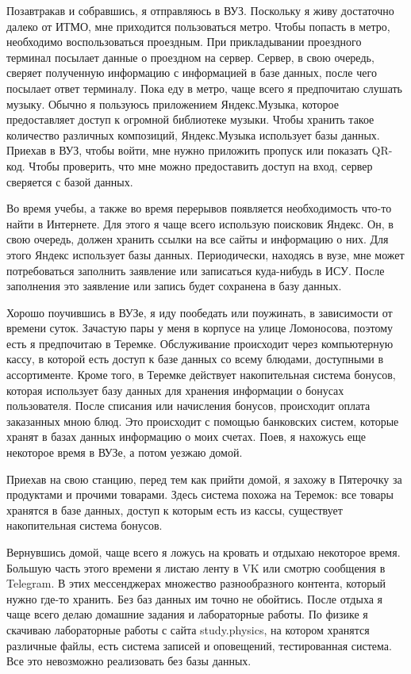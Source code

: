 \documentclass[a4paper,14pt]{extarticle}
\begin{document}
Позавтракав и собравшись, я отправляюсь в ВУЗ. Поскольку я живу достаточно далеко от ИТМО, мне приходится пользоваться метро. Чтобы попасть в метро, необходимо воспользоваться проездным. При прикладывании проездного терминал посылает данные о проездном на сервер. Сервер, в свою очередь, сверяет полученную информацию с информацией в базе данных, после чего посылает ответ терминалу. Пока еду в метро, чаще всего я предпочитаю слушать музыку. Обычно я пользуюсь приложением Яндекс.Музыка, которое предоставляет доступ к огромной библиотеке музыки. Чтобы хранить такое количество различных композиций, Яндекс.Музыка использует базы данных. Приехав в ВУЗ, чтобы войти, мне нужно приложить пропуск или показать QR-код. Чтобы проверить, что мне можно предоставить доступ на вход, сервер сверяется с базой данных.

Во время учебы, а также во время перерывов появляется необходимость что-то найти в Интернете. Для этого я чаще всего использую поисковик Яндекс. Он, в свою очередь, должен хранить ссылки на все сайты и информацию о них. Для этого Яндекс использует базы данных. Периодически, находясь в вузе, мне может потребоваться заполнить заявление или записаться куда-нибудь в ИСУ. После заполнения это заявление или запись будет сохранена в базу данных.

Хорошо поучившись в ВУЗе, я иду пообедать или поужинать, в зависимости от времени суток. Зачастую пары у меня в корпусе на улице Ломоносова, поэтому есть я предпочитаю в Теремке. Обслуживание происходит через компьютерную кассу, в которой есть доступ к базе данных со всему блюдами, доступными в ассортименте.  Кроме того, в Теремке действует накопительная система бонусов, которая использует базу данных для хранения информации о бонусах пользователя. После списания или начисления бонусов, происходит оплата заказанных мною блюд. Это происходит с помощью банковских систем, которые хранят в базах данных информацию о моих счетах. Поев, я нахожусь еще некоторое время в ВУЗе, а потом уезжаю домой.

Приехав на свою станцию, перед тем как прийти домой, я захожу в Пятерочку за продуктами и прочими товарами. Здесь система похожа на Теремок: все товары хранятся в базе данных, доступ к которым есть из кассы, существует накопительная система бонусов.

Вернувшись домой, чаще всего я ложусь на кровать и отдыхаю некоторое время. Большую часть этого времени я листаю ленту в VK или смотрю сообщения в Telegram. В этих мессенджерах множество разнообразного контента, который нужно где-то хранить. Без баз данных им точно не обойтись. После отдыха я чаще всего делаю домашние задания и лабораторные работы. По физике я скачиваю лабораторные работы с сайта study.physics, на котором хранятся различные файлы, есть система записей и оповещений, тестированная система. Все это невозможно реализовать без базы данных.
\end{document}
